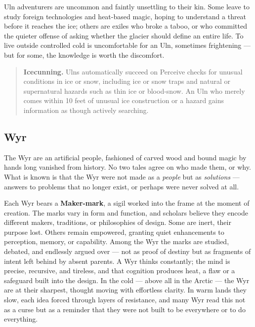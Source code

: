 Uln adventurers are uncommon and faintly unsettling to their kin. Some leave to study foreign technologies and heat-based magic, hoping to understand a threat before it reaches the ice; others are exiles who broke a taboo, or who committed the quieter offense of asking whether the glacier should define an entire life. To live outside controlled cold is uncomfortable for an Uln, sometimes frightening --- but for some, the knowledge is worth the discomfort.

\begin{quote}
\textbf{Icecunning.} Ulns automatically succeed on Perceive checks for unusual conditions in ice or snow, including ice or snow traps and natural or supernatural hazards such as thin ice or blood-snow. An Uln who merely comes within 10 feet of unusual ice construction or a hazard gains information as though actively searching.
\end{quote}

\subsection{Wyr}

The Wyr are an artificial people, fashioned of carved wood and bound magic by hands long vanished from history. No two tales agree on who made them, or why. What is known is that the Wyr were not made as a \textit{people} but as \textit{solutions} --- answers to problems that no longer exist, or perhaps were never solved at all.

Each Wyr bears a \textbf{Maker-mark}, a sigil worked into the frame at the moment of creation. The marks vary in form and function, and scholars believe they encode different makers, traditions, or philosophies of design. Some are inert, their purpose lost. Others remain empowered, granting quiet enhancements to perception, memory, or capability. Among the Wyr the marks are studied, debated, and endlessly argued over --- not as proof of destiny but as fragments of intent left behind by absent parents. A Wyr thinks constantly; the mind is precise, recursive, and tireless, and that cognition produces heat, a flaw or a safeguard built into the design. In the cold --- above all in the Arctic --- the Wyr are at their sharpest, thought moving with effortless clarity. In warm lands they slow, each idea forced through layers of resistance, and many Wyr read this not as a curse but as a reminder that they were not built to be everywhere or to do everything.

